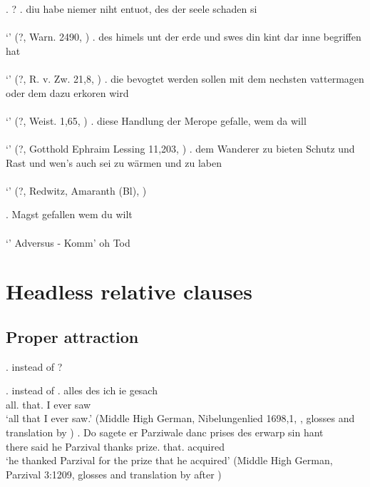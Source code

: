 \ex. ?
\ag. diu habe niemer niht entuot, des der seele schaden si\\
 \\
 `' \hfill (?, Warn. 2490, \citealt[761]{behaghel1923})
\bg. des himels unt der erde und swes din kint dar inne begriffen hat\\
 \\
 `' \hfill (?, R. v. Zw. 21,8, \citealt[761]{behaghel1923})
\bg. die bevogtet werden sollen mit dem nechsten vattermagen oder dem dazu erkoren wird\\
 \\
 `' \hfill (?, Weist. 1,65, \citealt[761]{behaghel1923})
\bg. diese Handlung der Merope gefalle, wem da will\\
 \\
 `' \hfill (?, Gotthold Ephraim Lessing 11,203, \citealt[761]{behaghel1923})
\bg. dem Wanderer zu bieten Schutz und Rast und wen's auch sei zu wärmen und zu laben\\
 \\
 `' \hfill (?, Redwitz, Amaranth (Bl), \citealt[761]{behaghel1923})

\exg. Magst gefallen wem du wilt\\
 \\
 `' \hfill Adversus - Komm' oh Tod




\section{Headless relative clauses}

\subsection{Proper attraction}

\ex.  instead of ?

\ex.  instead of 
\ag. alles des ich ie gesach\\
 all. that. I ever saw\\
 `all that I ever saw.' \hfill (Middle High German, Nibelungenlied 1698,1, \citealt[756]{behaghel1923}, glosses and translation by \citealt[199]{pittner1995})
\bg. Do sagete er Parziwale danc prises des erwarp sin hant\\
 there said he Parzival thanks prize. that. acquired\\
 `he thanked Parzival for the prize that he acquired' \hfill (Middle High German, Parzival 3:1209, glosses and translation by \citealt[174]{helgander1971} after \citealt[198]{pittner1995})


